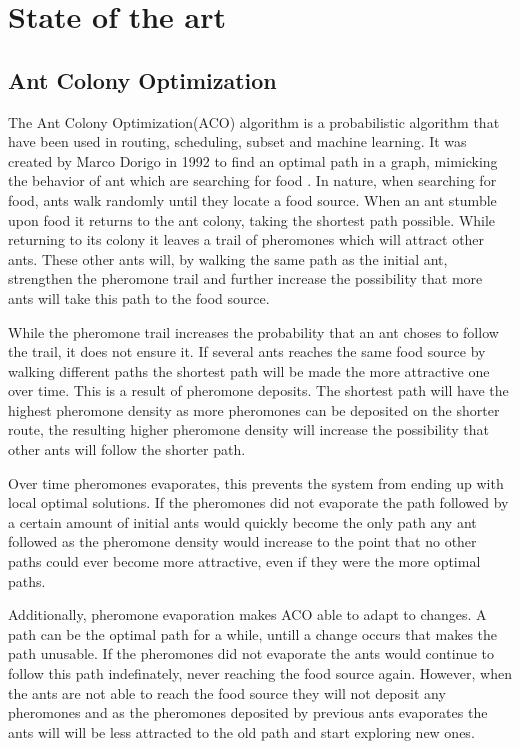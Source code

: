 \chapter{State of the art}
\label{ch:background}

\section{Ant Colony Optimization}

The Ant Colony Optimization(ACO) algorithm is a probabilistic algorithm that have been used in routing, scheduling, 
subset and machine learning. It was created by Marco Dorigo in 1992 to find an optimal path in a graph, mimicking the
behavior of ant which are searching for food \cite{aco}. In nature, when searching for food, ants walk randomly until
they locate a food source. When an ant stumble upon food it returns to the ant colony, taking the shortest path possible.
While returning to its colony it leaves a trail of pheromones which will attract other ants. These other ants will, by walking
the same path as the initial ant, strengthen the pheromone trail and further increase the possibility that more ants will
take this path to the food source.

While the pheromone trail increases the probability that an ant choses to follow the trail, it does not ensure it.
If several ants reaches the same food source by walking different paths the shortest path will be made the more attractive
one over time. This is a result of pheromone deposits. The shortest path will have the highest pheromone density as more
pheromones can be deposited on the shorter route, the resulting higher pheromone density will increase the possibility that 
other ants will follow the shorter path. 

Over time pheromones evaporates, this prevents the system from ending up with local optimal solutions. 
If the pheromones did not evaporate the path followed by a certain amount of initial ants
would quickly become the only path any ant followed as the pheromone density would increase to the point that no other paths
could ever become more attractive, even if they were the more optimal paths. 

Additionally, pheromone evaporation makes ACO able to adapt to changes. A path can be the optimal path for a while, untill a change
occurs that makes the path unusable. If the pheromones did not evaporate the ants would continue to follow this path indefinately,
never reaching the food source again. However, when the ants are not able to reach the food source they will not deposit any
pheromones and as the pheromones deposited by previous ants evaporates the ants will will be less attracted to the old path
and start exploring new ones.

